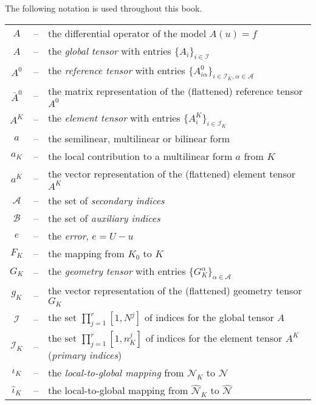 

The following notation is used throughout this book.

\small
\linespread{1.2}
  \begin{longtable}{ccl}
    $A$ &--&
    the differential operator of the model $A(u) = f$ \\
    $A$ &--&
    the \emph{global tensor} with entries $\{A_i\}_{i\in\mathcal{I}}$ \\
    $A^0$ &--&
    the \emph{reference tensor} with entries $\{A^0_{i\alpha}\}_{i\in\mathcal{I}_K,\alpha\in\mathcal{A}}$ \\
    $\bar{A}^0$ &--&
    the matrix representation of the (flattened) reference tensor $A^0$ \\
    $A^K$ &--&
    the \emph{element tensor} with entries $\{A^K_i\}_{i\in\mathcal{I}_K}$ \\
    $a$ &--&
    the semilinear, multilinear or bilinear form \\
    $a_K$ &--&
    the local contribution to a multilinear form $a$ from $K$ \\
    $a^K$ &--&
    the vector representation of the (flattened) element tensor $A^K$ \\
    $\mathcal{A}$ &--&
    the set of \emph{secondary indices} \\
    $\mathcal{B}$ &--&
    the set of \emph{auxiliary indices} \\
    $e$ &--&
    the \emph{error}, $e = U - u$ \\
    $F_K$ &--&
    the mapping from $K_0$ to $K$ \\
    $G_K$ &--&
    the \emph{geometry tensor} with entries $\{G_K^{\alpha}\}_{\alpha\in\mathcal{A}}$ \\
    $g_K$ &--&
    the vector representation of the (flattened) geometry tensor $G_K$ \\
    $\mathcal{I}$ &--&
    the set $\prod_{j=1}^r [1,N^j]$ of indices for the global tensor $A$ \\
    $\mathcal{I}_K$ &--&
    the set $\prod_{j=1}^r [1,n_K^j]$ of indices for the element tensor
    $A^K$ (\emph{primary indices}) \\
    $\iota_K$ &--&
    the \emph{local-to-global mapping} from $\mathcal{N}_K$ to $\mathcal{N}$ \\
    $\hat{\iota}_K$ &--&
    the local-to-global mapping from $\hat{\mathcal{N}}_K$ to $\hat{\mathcal{N}}$ \\

\end{longtable}
